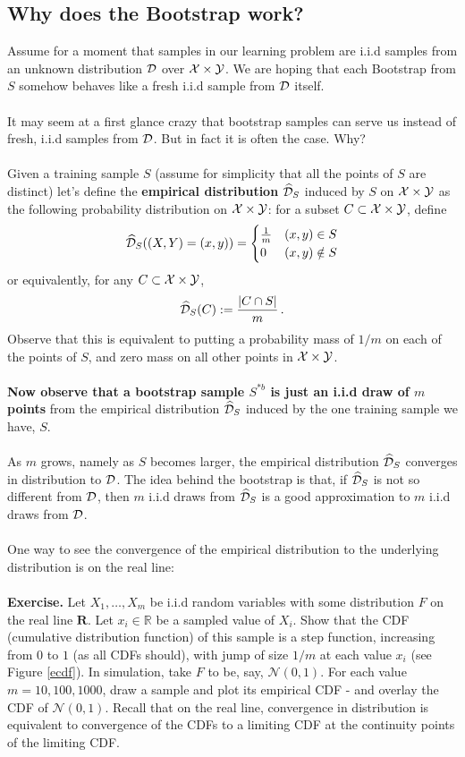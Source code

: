 \documentclass[11pt]{article}
\begin{document}
\subsection{Why does the Bootstrap work?}

Assume for a moment that samples in our learning problem are i.i.d samples from an unknown
distribution $\mathcal{D}$ over $\mathcal{X}\times \mathcal{Y}$. We are hoping that each Bootstrap from $S$
somehow
behaves like a fresh i.i.d sample from $\mathcal{D}$ itself.
\\~\\
It may seem at a first glance crazy that bootstrap samples can serve us instead
of fresh, i.i.d samples from $\mathcal{D}$. But in fact it is often the case. Why?
\\~\\
Given a training sample $S$ (assume for simplicity that all the points of $S$
are distinct) let's define the {\bf empirical distribution}
$\widehat{\mathcal{D}}_S$ induced by $S$ on $\mathcal{X}\times \mathcal{Y}$ as the following probability distribution
on $\mathcal{X}\times \mathcal{Y}$: for a subset $C\subset \mathcal{X}\times \mathcal{Y}$, define
\[
  \widehat{\mathcal{D}}_S( (X,Y)=(x,y) ) = 
  \begin{cases}
    \frac{1}{m} & (x,y)\in S\\ 
    0 & (x,y) \notin S
  \end{cases}
\]
or equivalently, for any $C\subset \mathcal{X}\times \mathcal{Y}$,
\[
  \widehat{\mathcal{D}}_S(C):= \frac{| C \cap S |}{m}\,.
\]
Observe that this is equivalent to putting a probability mass of $1/m$ on each
of the points of $S$, and zero mass on all other points in $\mathcal{X}\times \mathcal{Y}$. 
\\~\\
{\bf Now observe that a bootstrap sample $S^{*b}$ is just an i.i.d draw of $m$
points}
from the empirical distribution $\widehat{\mathcal{D}}_S$ induced by the one training sample we
have, $S$.
\\~\\
As $m$ grows, namely as $S$ becomes larger, the empirical distribution $\widehat{\mathcal{D}}_S$
converges in distribution to $\mathcal{D}$. The idea behind the bootstrap is that, if
$\widehat{\mathcal{D}}_S$ is not so different from $\mathcal{D}$, then $m$ i.i.d draws from
$\widehat{\mathcal{D}}_S$ is a good
approximation to $m$ i.i.d draws from $\mathcal{D}$. 
\\~\\
One way to see the convergence of the empirical distribution to the underlying
distribution is on the real line:
\\~\\
{\bf Exercise.} Let $X_1,\ldots,X_m$ be i.i.d random variables with some
distribution $F$ on the real line $\mathbf{R}$. Let $x_i\in\mathbb{R}$ be a sampled value of
$X_i$. Show that the CDF (cumulative distribution function) of this sample is a
step function, increasing from $0$ to $1$ (as all CDFs should), with jump of
size $1/m$ at each value $x_i$ (see Figure \ref{ecdf}). 
In simulation, take $F$ to be, say,
$\mathcal{N}(0,1)$. For each value $m=10,100,1000$, draw a sample and plot its
empirical CDF - and overlay the CDF of $\mathcal{N}(0,1)$. Recall that on the
real line, convergence in distribution is equivalent to convergence of the CDFs
to a limiting CDF at the continuity points of the limiting CDF.
\end{document}
